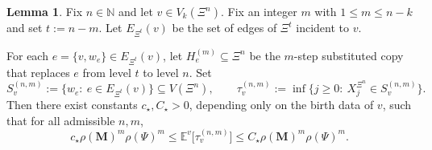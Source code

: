 \documentclass{article}
\theoremstyle{plain}
\theoremstyle{definition}
\newtheorem{lemma}[theorem]{Lemma}
\begin{document}
\begin{lemma}\label{lem:star_domain_exit_time_scale}
Fix $n\in\mathbb N$ and let $v\in V_k(\Xi^n)$.
Fix an integer $m$ with $1\le m\le n-k$ and set $t:=n-m$.
Let $E_{\Xi^{t}}(v)$ be the set of edges of $\Xi^{t}$ incident to $v$.

For each $e=\{v,w_e\}\in E_{\Xi^{t}}(v)$, let $H_e^{(m)}\subseteq \Xi^n$ be the $m$-step substituted copy that replaces $e$ from level $t$ to level $n$.
Set
\[
S_{v}^{(n,m)}:=\{w_e:\ e\in E_{\Xi^{t}}(v)\}\subseteq V(\Xi^n),
\qquad
\tau_{v}^{(n,m)}:=\inf\{j\ge 0:\ X_j^{\Xi^n}\in S_{v}^{(n,m)}\}.
\]
Then there exist constants $c_{\star},C_{\star}>0$, depending only on the birth data of $v$, such that for all admissible $n,m$,
\[
c_{\star} \rho(\mathbf M)^m\rho(\Psi)^m
\le
\mathbb E^v\big[\tau_{v}^{(n,m)}\big]
\le
C_{\star} \rho(\mathbf M)^m\rho(\Psi)^m.
\]
\end{lemma}
\end{document}
